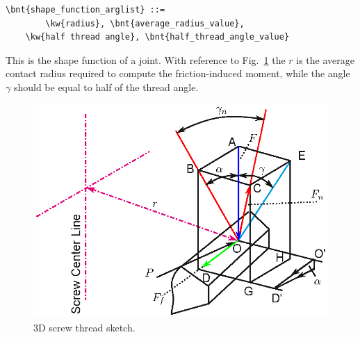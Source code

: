 \begin{enumerate}
\begin{Verbatim}[commandchars=\\\{\}]
    \bnt{shape_function_arglist} ::= 
        \kw{radius}, \bnt{average_radius_value},
	\kw{half thread angle}, \bnt{half_thread_angle_value}
\end{Verbatim}
    This is the shape function of a  joint. 
    With reference to Fig.~\ref{fig:screw_sketch_3D} the  $r$
    is the average contact radius required to compute the friction-induced moment, while 
    the  angle $\gamma$ should be equal to half of the thread angle.
  \begin{figure}[h]
    \begin{center}
      \includegraphics{../tecman/Screw_sketch}
    \end{center}
    \caption{3D screw thread sketch.}
    \label{fig:screw_sketch_3D}
  \end{figure}

\end{enumerate}



